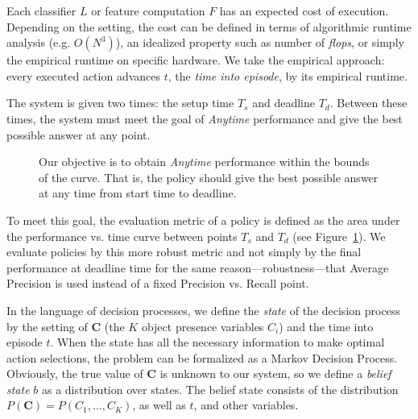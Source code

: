\documentclass[runningheads]{llncs}
\begin{document}
Each classifier $L$ or feature computation $F$ has an expected cost of execution.
Depending on the setting, the cost can be defined in terms of algorithmic runtime analysis (e.g. $O(N^3)$), an idealized property such as number of \emph{flops}, or simply the empirical runtime on specific hardware.
We take the empirical approach: every executed action advances $t$, the \emph{time into episode}, by its empirical runtime.

The system is given two times: the setup time $T_s$ and deadline $T_d$.
Between these times, the system must meet the goal of \emph{Anytime} performance and give the best possible answer at any point.

\begin{figure}[h!]
  \caption{\label{fig:evaluation}Our objective is to obtain \emph{Anytime} performance within the bounds of the curve. That is, the policy should give the best possible answer at any time from start time to deadline.}
\end{figure}

To meet this goal, the evaluation metric of a policy is defined as the area under the performance vs. time curve between points $T_s$ and $T_d$ (see Figure~\ref{fig:evaluation}).
We evaluate policies by this more robust metric and not simply by the final performance at deadline time for the same reason---robustness---that Average Precision is used instead of a fixed Precision vs. Recall point.

In the language of decision processes, we define the \emph{state} of the decision process by the setting of $\mathbf{C}$ (the $K$ object presence variables $C_i$) and the time into episode $t$.
When the state has all the necessary information to make optimal action selections, the problem can be formalized as a Markov Decision Process.
Obviously, the true value of $\mathbf{C}$ is unknown to our system, so we define a \emph{belief state} $b$ as a distribution over states.
The belief state consists of the distribution $P(\mathbf{C}) = P(C_1, \dots, C_K)$, as well as $t$, and other variables.
\end{document}
